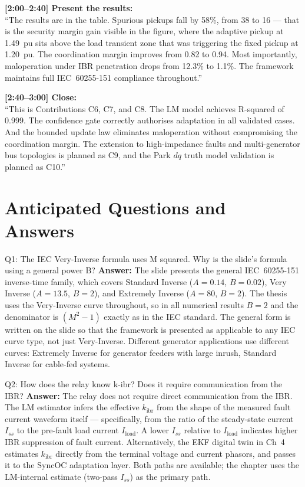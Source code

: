 \documentclass[12pt,a4paper]{article}
\newcommand{\kibr}{k_\mathrm{ibr}}
\begin{document}
\begin{speakbox}
\textbf{[2:00--2:40] Present the results:}\\
``The results are in the table. Spurious pickups fall by 58\%, from 38 to 16 --- that is the security margin gain visible in the figure, where the adaptive pickup at 1.49~pu sits above the load transient zone that was triggering the fixed pickup at 1.20~pu. The coordination margin improves from 0.82 to 0.94. Most importantly, maloperation under IBR penetration drops from 12.3\% to 1.1\%. The framework maintains full IEC~60255-151 compliance throughout.''

\textbf{[2:40--3:00] Close:}\\
``This is Contributions C6, C7, and C8. The LM model achieves R-squared of 0.999. The confidence gate correctly authorises adaptation in all validated cases. And the bounded update law eliminates maloperation without compromising the coordination margin. The extension to high-impedance faults and multi-generator bus topologies is planned as C9, and the Park $dq$ truth model validation is planned as C10.''
\end{speakbox}

\section{Anticipated Questions and Answers}

\begin{keybox}{Q1: The IEC Very-Inverse formula uses M squared. Why is the slide's formula using a general power B?}
\textbf{Answer:} The slide presents the general IEC~60255-151 inverse-time family, which covers Standard Inverse ($A = 0.14$, $B = 0.02$), Very Inverse ($A = 13.5$, $B = 2$), and Extremely Inverse ($A = 80$, $B = 2$). The thesis uses the Very-Inverse curve throughout, so in all numerical results $B = 2$ and the denominator is $(M^2 - 1)$ exactly as in the IEC standard. The general form is written on the slide so that the framework is presented as applicable to any IEC curve type, not just Very-Inverse. Different generator applications use different curves: Extremely Inverse for generator feeders with large inrush, Standard Inverse for cable-fed systems.
\end{keybox}

\begin{keybox}{Q2: How does the relay know k-ibr? Does it require communication from the IBR?}
\textbf{Answer:} The relay does not require direct communication from the IBR. The LM estimator infers the effective $\kibr$ from the shape of the measured fault current waveform itself --- specifically, from the ratio of the steady-state current $I_{ss}$ to the pre-fault load current $I_\mathrm{load}$. A lower $I_{ss}$ relative to $I_\mathrm{load}$ indicates higher IBR suppression of fault current. Alternatively, the EKF digital twin in Ch~4 estimates $\kibr$ directly from the terminal voltage and current phasors, and passes it to the SyncOC adaptation layer. Both paths are available; the chapter uses the LM-internal estimate (two-pass $I_{ss}$) as the primary path.
\end{keybox}
\end{document}
